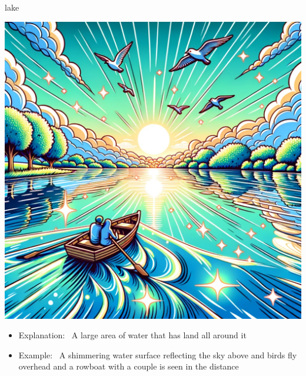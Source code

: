 \documentclass[avery5371, grid,frame]{flashcards}
\begin{document}
\renewcommand{\cardpaper}{a4paper}
\renewcommand{\cardpapermode}{landscape}
\renewcommand{\cardrows}{2}
\renewcommand{\cardcolumns}{2}
\setlength{\cardheight}{3.5in}
\setlength{\cardwidth}{5.0in}
\setlength{\topoffset}{0.65in}
\setlength{\oddoffset}{0.65in}
\setlength{\evenoffset}{0.65in}

\begin{flashcard}{lake}
    \vspace*{\fill}
    \begin{center}
        \begin{minipage}[c]{.45\textwidth}
            \includegraphics[width=\textwidth]{cards/l/lake/lake - A shimmering water surface reflecting the sky above and birds fly overhead and a rowboat with a couple is seen in the distance.png}
        \end{minipage}
        \begin{minipage}[c]{.45\textwidth}
            \begin{itemize}\setlength\itemsep{12pt}
            \item Explanation: \ A large area of water that has land all around it
            \item Example: \ A shimmering water surface reflecting the sky above and birds fly overhead and a rowboat with a couple is seen in the distance
            \end{itemize}

\end{minipage}
\end{center}
\end{flashcard}
\end{document}
